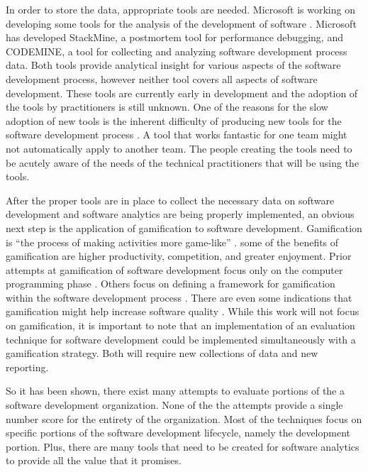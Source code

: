\documentclass[SDSUThesis.tex]{subfiles}
\begin{document}
    In order to store the data, appropriate tools are needed.  Microsoft
    is working on developing some tools for the analysis of the development
    of software \cite{Czerwonka2013,Zhang2013}.  Microsoft has developed
    StackMine, a postmortem tool for performance debugging, and CODEMINE,
    a tool for collecting and analyzing software development process data.
    Both tools provide analytical insight for various aspects of the 
    software development process, however neither tool covers all aspects
    of software development.
    These tools are currently early in development and the adoption of the
    tools by practitioners is still unknown. One of the reasons for the slow
    adoption of new tools is the inherent difficulty of producing
    new tools for the software development process \cite{Spraragen2005}. A 
    tool that works fantastic for one team might not automatically apply to 
    another team.  The people creating the tools need to be acutely aware
    of the needs of the technical practitioners that will be using the
    tools.  

    After the proper tools are in place to collect the necessary
    data on software development and software analytics are being
    properly implemented, an obvious next step is the
    application of gamification to software development. Gamification
    is ``the process of making activities more game-like'' \cite{Werbach2014}.
    some of the benefits of gamification are higher productivity, competition,
    and greater enjoyment.  
    Prior attempts
    at gamification of software development focus only on 
    the computer programming phase \cite{Snipes2013}. Others
    focus on defining a framework for gamification within
    the software development process \cite{Jain2013}. There are 
    even some indications that gamification might help increase
    software quality \cite{Dubois2013}. 
    While this work will not focus on gamification, it is important to note
    that an implementation of an evaluation technique for software
    development could be implemented simultaneously with a gamification
    strategy. Both will require new collections of data and new reporting.

    So it has been shown, there exist many attempts to 
    evaluate portions of the a software development 
    organization.  None of the the attempts provide
    a single number score for the entirety of the 
    organization.  Most of the techniques focus on
    specific portions of the software development 
    lifecycle, namely the development portion. Plus,
    there are many tools that need to be created for
    software analytics to provide all the value
    that it promises.
\end{document}
